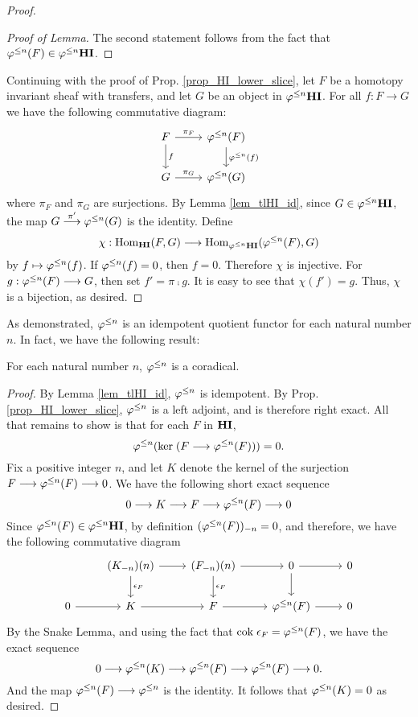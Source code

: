\begin{proof}
\begin{proof}[Proof of Lemma]
The second statement follows from the fact that $\tlHI{n}(F) \in 
\tlHI{n}\HI$.
\end{proof}

Continuing with the proof of Prop. \ref{prop_HI_lower_slice}, let
$F$ be a homotopy invariant sheaf with transfers, and let $G$ be 
an object in $\tlHI{n}\HI$. For all $f: F \to G$ we have the 
following commutative diagram:
\[
\begin{tikzcd}
F \arrow{r}{\pi_F} \arrow{d}{f}
& \tlHI{n}(F) \arrow{d}{\tlHI{n}(f)} \\
G \arrow{r}{\pi_G}
& \tlHI{n}(G) 
\end{tikzcd}
\]
where $\pi_F$ and $\pi_G$ are surjections. By Lemma 
\ref{lem_tlHI_id}, since $G \in \tlHI{n}\HI$, the map $G 
\stackrel{\pi'}{\to} \tlHI{n}(G)$ is the identity. Define
\[
\chi : \homHI(F, G) \to \hom_{\tlHI{n}\HI}(\tlHI{n}(F), G)
\]
by $f \mapsto \tlHI{n}(f)$. If $\tlHI{n}(f) = 0$, then $f = 0$.
Therefore $\chi$ is injective. For $g: \tlHI{n}(F) \to G$, then
set $f' = \pi \comp g$. It is easy to see that $\chi(f') = g$.
Thus, $\chi$ is a bijection, as desired.
\end{proof}

As demonstrated, $\tlHI{n}$ is an idempotent quotient functor
for each natural number $n$. In fact, we have the following 
result:

\begin{prop}\label{prop_tlHIn_corad}
For each natural number $n$, $\tlHI{n}$ is a coradical.
\end{prop}
\begin{proof}
By Lemma \ref{lem_tlHI_id}, $\tlHI{n}$ is idempotent. By Prop. 
\ref{prop_HI_lower_slice}, $\tlHI{n}$ is a left adjoint, and
is therefore right exact. All that remains to show is that for
each $F$ in $\HI$,
\[
\tlHI{n}(\ker (F \to \tlHI{n}(F))) = 0.
\]
Fix a positive integer $n$, and let $K$ denote the kernel of the 
surjection $F \to \tlHI{n}(F) \to 0$. We have the following short 
exact sequence 
\[
0 \to K \to F \to \tlHI{n}(F) \to 0
\]
Since $\tlHI{n}(F) \in \tlHI{n}\HI$, by definition 
$\RHI[n]{(\tlHI{n}(F))} = 0$, and therefore, we have the following
commutative diagram
\[
\begin{tikzcd}
{} &\LHI[n]{(\RHI[n]{K})} \arrow{d}{\cuHI_F} \arrow{r}
   &\LHI[n]{(\RHI[n]{F})} \arrow{d}{\cuHI_F} \arrow{r}
   &0 \arrow{d} \arrow{r}
   &0 \\
0 \arrow{r} &
  K \arrow{r}&
  F \arrow{r}&
  \tlHI{n}(F) \arrow{r}&
  0
\end{tikzcd}
\]
By the Snake Lemma, and using the fact that $\cok \cuHI_F = 
\tlHI{n}(F)$, we have the exact sequence
\[
0 \to \tlHI{n}(K) \to \tlHI{n}(F) \to \tlHI{n}(F) \to 0.
\]
And the map $\tlHI{n}(F) \to \tlHI{n}$ is the identity. It follows 
that $\tlHI{n}(K) = 0$ as desired.
\end{proof}

